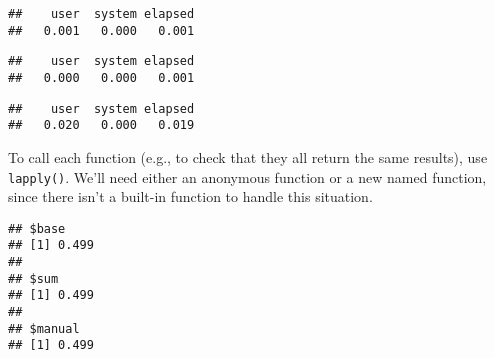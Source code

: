 \begin{Shaded}
\begin{Highlighting}[]
\StringTok{ }\NormalTok{(}\NormalTok{)}
\OperatorTok{$}
\end{Highlighting}
\end{Shaded}

\begin{verbatim}
##    user  system elapsed 
##   0.001   0.000   0.001
\end{verbatim}

\begin{Shaded}
\begin{Highlighting}[]
\NormalTok{(compute_mean[[}\NormalTok{]](x))}
\end{Highlighting}
\end{Shaded}

\begin{verbatim}
##    user  system elapsed 
##   0.000   0.000   0.001
\end{verbatim}

\begin{Shaded}
\begin{Highlighting}[]
\NormalTok{(compute_mean[[}\NormalTok{]](x))}
\end{Highlighting}
\end{Shaded}

\begin{verbatim}
##    user  system elapsed 
##   0.020   0.000   0.019
\end{verbatim}

To call each function (e.g., to check that they all return the same
results), use \texttt{lapply()}. We'll need either an anonymous function
or a new named function, since there isn't a built-in function to handle
this situation.

\begin{Shaded}
\begin{Highlighting}[]
\end{Highlighting}
\end{Shaded}

\begin{verbatim}
## $base
## [1] 0.499
## 
## $sum
## [1] 0.499
## 
## $manual
## [1] 0.499
\end{verbatim}

